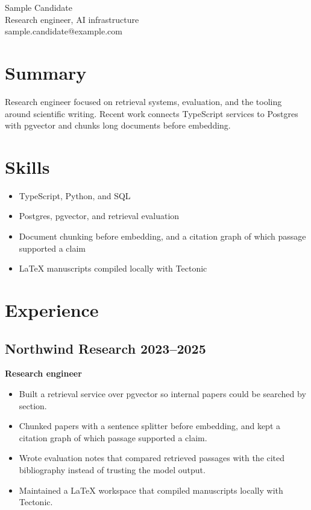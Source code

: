 \documentclass[11pt]{article}
\begin{document}
\begin{center}
{\LARGE Sample Candidate}\\[0.3em]
Research engineer, AI infrastructure\\[0.3em]
sample.candidate@example.com
\end{center}

\section*{Summary}
Research engineer focused on retrieval systems, evaluation, and the tooling around scientific writing. Recent work connects TypeScript services to Postgres with pgvector and chunks long documents before embedding.

\section*{Skills}
\begin{itemize}
\item TypeScript, Python, and SQL
\item Postgres, pgvector, and retrieval evaluation
\item Document chunking before embedding, and a citation graph of which passage supported a claim
\item LaTeX manuscripts compiled locally with Tectonic
\end{itemize}

\section*{Experience}
\subsection*{Northwind Research \hfill 2023--2025}
\textbf{Research engineer}
\begin{itemize}
\item Built a retrieval service over pgvector so internal papers could be searched by section.
\item Chunked papers with a sentence splitter before embedding, and kept a citation graph of which passage supported a claim.
\item Wrote evaluation notes that compared retrieved passages with the cited bibliography instead of trusting the model output.
\item Maintained a LaTeX workspace that compiled manuscripts locally with Tectonic.
\end{itemize}
\end{document}
